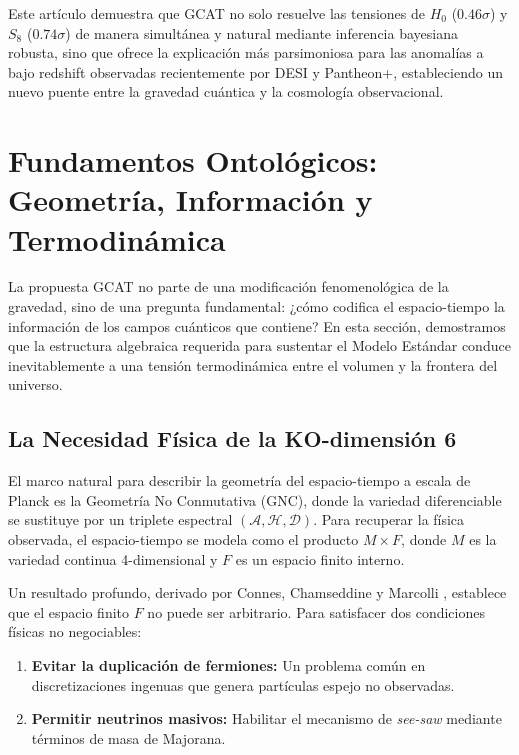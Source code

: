 \documentclass[12pt, a4paper]{article}
\theoremstyle{plain}
\theoremstyle{definition}
\begin{document}
Este artículo demuestra que GCAT no solo resuelve las tensiones de $H_0$ ($0.46\sigma$) y $S_8$ ($0.74\sigma$) de manera simultánea y natural mediante inferencia bayesiana robusta, sino que ofrece la explicación más parsimoniosa para las anomalías a bajo redshift observadas recientemente por DESI y Pantheon+, estableciendo un nuevo puente entre la gravedad cuántica y la cosmología observacional.

\section{Fundamentos Ontológicos: Geometría, Información y Termodinámica}
\label{sec:fundamentos}

La propuesta GCAT no parte de una modificación fenomenológica de la gravedad, sino de una pregunta fundamental: ¿cómo codifica el espacio-tiempo la información de los campos cuánticos que contiene? En esta sección, demostramos que la estructura algebraica requerida para sustentar el Modelo Estándar conduce inevitablemente a una tensión termodinámica entre el volumen y la frontera del universo.

\subsection{La Necesidad Física de la KO-dimensión 6}

El marco natural para describir la geometría del espacio-tiempo a escala de Planck es la Geometría No Conmutativa (GNC), donde la variedad diferenciable se sustituye por un triplete espectral $(\mathcal{A}, \mathcal{H}, \mathcal{D})$. Para recuperar la física observada, el espacio-tiempo se modela como el producto $M \times F$, donde $M$ es la variedad continua 4-dimensional y $F$ es un espacio finito interno.

Un resultado profundo, derivado por Connes, Chamseddine y Marcolli \cite{Connes2008, Chamseddine2012}, establece que el espacio finito $F$ no puede ser arbitrario. Para satisfacer dos condiciones físicas no negociables:
\begin{enumerate}
    \item \textbf{Evitar la duplicación de fermiones:} Un problema común en discretizaciones ingenuas que genera partículas espejo no observadas.
    \item \textbf{Permitir neutrinos masivos:} Habilitar el mecanismo de \textit{see-saw} mediante términos de masa de Majorana.
\end{enumerate}
\end{document}
